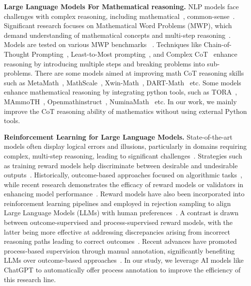 \textbf{Large Language Models For Mathematical reasoning.} NLP models face challenges with complex reasoning, including mathematical~\citep{long2024-llms-survey, zhang2024-geoeval, xia2024-evaluating}, common-sense~\citep{talmor-etal-2019-commonsenseqa}. Significant research focuses on Mathematical Word Problems (MWP), which demand understanding of mathematical concepts and multi-step reasoning~\citep{zheng2023php,zhao2023modelselection, yuan2023RFT}. Models are tested on various MWP benchmarks ~\citep{roy-roth-2015-solving-multiarith, hendrycks2021measuring}. Techniques like Chain-of-Thought Prompting~\citep{wei2022chain}, Least-to-Most prompting~\citep{Zhou2022LeasttoMostPE}, and Complex CoT~\citep{fu2023complexity-cot-based} enhance reasoning by introducing multiple steps and breaking problems into sub-problems. There are some models aimed at improving math CoT reasoning skills such as MetaMath~\citep{yu2023metamath}, MathScale~\citep{tang2024mathscale}, Xwin-Math~\citep{li2024-Xwin-math}, DART-Math~\citep{tong2024-DART} etc. Some models enhance mathematical reasoning by integrating python tools, such as TORA~\citep{gou2023tora}, MAmmoTH~\citep{yue2023mammoth}, Openmathinstruct~\citep{toshniwal2024-openmathinstruct}, NuminaMath~\citep{li2024-numinamath} etc. In our work, we mainly improve the CoT reasoning ability of mathematics without using external Python tools.

\textbf{Reinforcement Learning for Large Language Models.} State-of-the-art models often display logical errors and illusions, particularly in domains requiring complex, multi-step reasoning, leading to significant challenges~\citep{bubeck2023sparks, maynez2020faithfulness}. Strategies such as training reward models help discriminate between desirable and undesirable outputs~\citep{lightman2023openai-verify-step-by-step,Wu2023FineGrainedHF, chen2024-fine-grain-improving}. Historically, outcome-based approaches focused on algorithmic tasks~\citep{ Li2016NeuralPL, cai2017making,Yu2023OutcomesupervisedVF}, while recent research demonstrates the efficacy of reward models or validators in enhancing model performance~\citep{cobbe2021training_gsm8k_2,Wang2023MakingLL,Wang2023LargeLM,Li2022MakingLM}. Reward models have also been incorporated into reinforcement learning pipelines and employed in rejection sampling to align Large Language Models (LLMs) with human preferences~\citep{ shen2021generate,bai2022constitutional-claude,yuan2023rrhf, dong2023raft,song2023preference, touvron2023llama2, rafailov2024DPO, meng2024simpo}. A contrast is drawn between outcome-supervised and process-supervised reward models, with the latter being more effective at addressing discrepancies arising from incorrect reasoning paths leading to correct outcomes~\citep{uesato2022deepmind-orms,zelikman2022star, creswell2022selectioninference}. Recent advances have promoted process-based supervision through manual annotation, significantly benefiting LLMs over outcome-based approaches~\citep{lightman2023openai-verify-step-by-step,wang2024-mathshepherd, sun2024-easy-to-hard, chen2024-autoprm, wang2024-multi-prm, zhang2024-rest-mcts}. In our study, we leverage AI models like ChatGPT to automatically offer process annotation to improve the efficiency of this research line.

